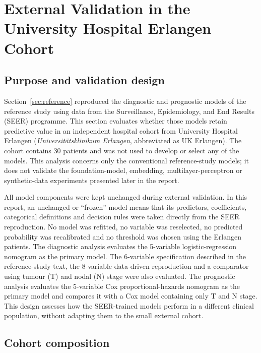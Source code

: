 \section{External Validation in the University Hospital Erlangen Cohort}
\label{sec:external-validation}

\subsection{Purpose and validation design}
\label{sec:external-validation:scope}

Section~\ref{sec:reference} reproduced the diagnostic and prognostic models of
the reference study \citep{Li2023} using data from the Surveillance, Epidemiology, and End
Results (SEER) programme. This section evaluates whether those models retain
predictive value in an independent hospital cohort from University Hospital
Erlangen (\emph{Universit\"atsklinikum Erlangen}, abbreviated as UK Erlangen).
The cohort contains 30 patients and was not used to develop or select any of the
models. This analysis concerns only the conventional reference-study models; it
does not validate the foundation-model, embedding, multilayer-perceptron or
synthetic-data experiments presented later in the report.

All model components were kept unchanged during external validation. In this
report, an unchanged or ``frozen'' model means that its predictors, coefficients,
categorical definitions and decision rules were taken directly from the SEER
reproduction. No model was refitted, no variable was reselected, no predicted
probability was recalibrated and no threshold was chosen using the Erlangen
patients. The diagnostic analysis evaluates the 5-variable logistic-regression
nomogram as the primary model. The 6-variable specification described in the
reference-study text, the 8-variable data-driven reproduction and a comparator
using tumour (T) and nodal (N) stage were also evaluated. The prognostic analysis
evaluates the 5-variable Cox proportional-hazards nomogram as the primary model
and compares it with a Cox model containing only T and N stage. This design
assesses how the SEER-trained models perform in a different clinical population,
without adapting them to the small external cohort.

\subsection{Cohort composition}
\label{sec:external-validation:cohort}

